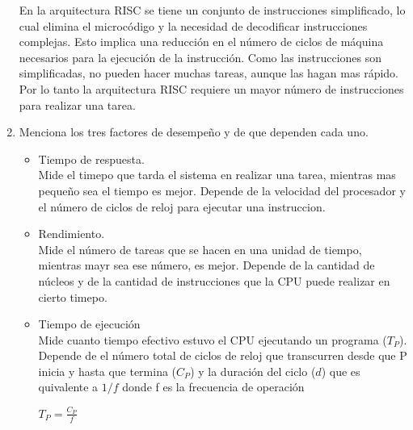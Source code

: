 \documentclass[a4paper,12pt]{article}
\begin{document}
\begin{enumerate}[label=\textcolor{teal}{\textbf{\arabic*.}}]
            En la arquitectura RISC se tiene un conjunto de instrucciones simplificado, lo cual elimina el microcódigo y la necesidad de
            decodificar instrucciones complejas. Esto implica una reducción en el número
            de ciclos de máquina necesarios para la ejecución de la instrucción. Como las instrucciones son simplificadas, 
            no pueden hacer muchas tareas, aunque las hagan mas rápido.\\

            Por lo tanto la arquitectura RISC requiere un mayor número de instrucciones para realizar una tarea.\\
        

        \item Menciona los tres factores de desempeño y de que dependen cada uno.
      
            \begin{itemize}
                \item Tiempo de respuesta.\\
                    Mide el timepo que tarda el sistema en realizar una tarea, mientras mas pequeño sea el tiempo es mejor. Depende de la velocidad del procesador y el número de ciclos de reloj para ejecutar una instruccion.
                \item Rendimiento.\\
                    Mide el número de tareas que se hacen en una unidad de tiempo, mientras mayr sea ese número, es mejor. Depende de la cantidad de núcleos y de la cantidad de instrucciones que la CPU puede realizar en cierto timepo.
                \item Tiempo de ejecución\\
                    Mide cuanto tiempo efectivo estuvo el CPU ejecutando un programa ($T_P$). Depende de el número total de ciclos de reloj que transcurren desde que P inicia y hasta que
                    termina ($C_P$) y la duración del ciclo ($d$) que es quivalente a $1/f$ donde f es la frecuencia de operación \\
                    \begin{center}
                        $T_P = \frac{C_P}{f}$
                    \end{center}
            \end{itemize}



\end{enumerate}
\end{document}
